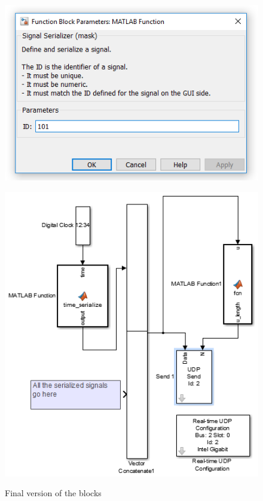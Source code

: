 \begin{figure}[H]
	\centering
	\begin{minipage}{.49\textwidth}
		\centering
		\includegraphics[width=\linewidth]{implementation/popupfinal}
		\label{fig:finalpopup}
	\end{minipage}
	\begin{minipage}{.49\textwidth}
		\centering
		\includegraphics[width=\linewidth]{implementation/UDPPacketfinal3}
		\label{fig:finaludpsys}
	\end{minipage}
	\caption{Final version of the blocks}
	\label{fig:finalimplementation}
\end{figure}

